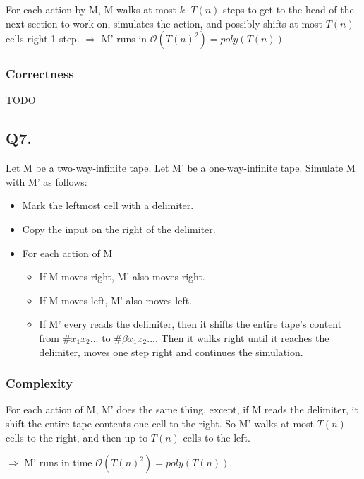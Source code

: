 \documentclass[letterpaper]{article}
\begin{document}
For each action by M, M walks at most $k \cdot T(n)$ steps to get to the
head of the next section to work on, simulates the action, and possibly
shifts at most $T(n)$ cells right 1 step. $\Rightarrow $ M' runs in
$\mathcal{O}(T(n)^2) = poly(T(n))$

\subsubsection*{Correctness}

TODO

\subsection*{Q7.}

Let M be a two-way-infinite tape.
Let M' be a one-way-infinite tape.
Simulate M with M' as follows:
\begin{itemize}
      \item Mark the leftmost cell with a delimiter.
      \item Copy the input on the right of the delimiter.
      \item For each action of M
            \begin{itemize}
                  \item If M moves right, M' also moves right.
                  \item If M moves left, M' also moves left.
                  \item If M' every reads the delimiter, then it shifts the entire
                        tape's content from $\# x_1 x_2 ...$ to $\# \beta x_1 x_2 ...$.
                        Then it walks right until it reaches the delimiter,
                        moves one step right and continues
                        the simulation.
            \end{itemize}
\end{itemize}

\subsubsection*{Complexity}

For each action of M, M' does the same thing, except, if M reads the delimiter,
it shift the entire tape contents one cell to the right. So M' walks at most
$T(n)$ cells to the right, and then up to $T(n)$ cells to the left.

$\Rightarrow$ M' runs in time $\mathcal{O}(T(n)^2) = poly(T(n))$.
\end{document}
